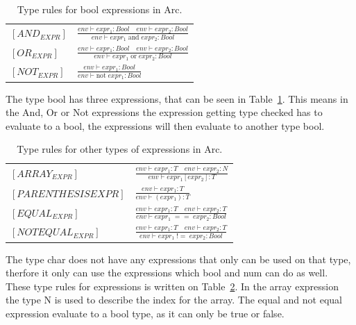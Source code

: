 \begin{table}[htb!]
    \centering
    \begin{tabular}{ll}
        \toprule
        $[AND_{EXPR}] $ & $\frac
            {env\vdash expr_1: Bool \quad env\vdash expr_2: Bool}
            {env\vdash expr_1 \;\text{and} \;expr_2: Bool}$
        \\ [12pt]
        $[OR_{EXPR}] $  & $\frac
            {env\vdash expr_1: Bool \quad env\vdash expr_2: Bool}
            {env\vdash expr_1 \;\text{or} \;expr_2: Bool}$
        \\ [12pt]
        $[NOT_{EXPR}] $ & $\frac
            {env\vdash expr_1: Bool}
            {env\vdash \text{not} \; expr_1 : Bool}$
        \\
        \bottomrule
    \end{tabular}
    \caption{Type rules for bool expressions in Arc.}
    \label{tab:bool-rules}
\end{table}


The type bool has three expressions, that can be seen in Table~\ref{tab:bool-rules}. This means in the And, Or or Not expressions the expression getting type checked has to evaluate to a bool, the expressions will then evaluate to another type bool.


\begin{table}[htb!]
    \centering
    \begin{tabular}{ll}
        \toprule
        $[ARRAY_{EXPR}]$      & $ \frac
            {env\vdash expr_1: T \quad env \vdash expr_2 : N}
            {env\vdash expr_1[expr_2] : T}$
        \\ [12pt]
        $[PARENTHESIS{EXPR}]$ & $ \frac
            {env\vdash expr_1: T}
            {env\vdash (expr_1) : T}$
        \\ [12pt]
        $[EQUAL_{EXPR}] $     & $\frac
            {env\vdash expr_1: T \quad env\vdash expr_2: T}
            {env\vdash expr_1 \;== \;expr_2: Bool}$
        \\ [12pt]
        $[NOTEQUAL_{EXPR}] $  & $\frac
            {env\vdash expr_1: T \quad env\vdash expr_2: T}
            {env\vdash expr_1 \;!= \;expr_2: Bool}$
        \\
        \bottomrule
    \end{tabular}
    \caption{Type rules for other types of expressions in Arc.}
    \label{tab:expr-rules}
\end{table}


The type char does not have any expressions that only can be used on that type, therfore it only can use the expressions which bool and num can do as well. These type rules for expressions is written on Table~\ref{tab:expr-rules}. In the array expression the type N is used to describe the index for the array. The equal and not equal expression evaluate to a bool type, as it can only be true or false.



